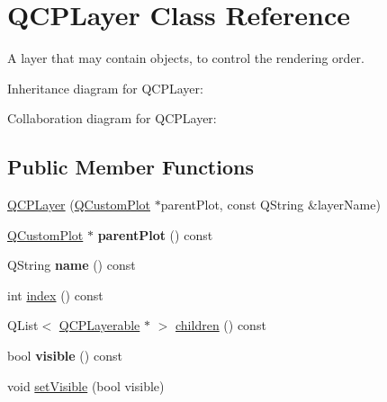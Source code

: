 \hypertarget{class_q_c_p_layer}{}\section{Q\+C\+P\+Layer Class Reference}
\label{class_q_c_p_layer}


A layer that may contain objects, to control the rendering order.  




Inheritance diagram for Q\+C\+P\+Layer\+:


Collaboration diagram for Q\+C\+P\+Layer\+:
\subsection*{Public Member Functions}
\begin{DoxyCompactItemize}
\item 
\hyperlink{class_q_c_p_layer_a5d0657fc86d624e5efbe930ef21af718}{Q\+C\+P\+Layer} (\hyperlink{class_q_custom_plot}{Q\+Custom\+Plot} $\ast$parent\+Plot, const Q\+String \&layer\+Name)
\item 
\hyperlink{class_q_custom_plot}{Q\+Custom\+Plot} $\ast$ {\bfseries parent\+Plot} () const \hypertarget{class_q_c_p_layer_a3958c9a938c2d05a7378c41484acee08}{}\label{class_q_c_p_layer_a3958c9a938c2d05a7378c41484acee08}

\item 
Q\+String {\bfseries name} () const \hypertarget{class_q_c_p_layer_a96ebd1e436f3813938cb9cd4a59a60be}{}\label{class_q_c_p_layer_a96ebd1e436f3813938cb9cd4a59a60be}

\item 
int \hyperlink{class_q_c_p_layer_ad5d7010829a6b99f326b07d7e37c8c99}{index} () const 
\item 
Q\+List$<$ \hyperlink{class_q_c_p_layerable}{Q\+C\+P\+Layerable} $\ast$ $>$ \hyperlink{class_q_c_p_layer_a94c2f0100e48cefad2de8fe0fbb03c27}{children} () const 
\item 
bool {\bfseries visible} () const \hypertarget{class_q_c_p_layer_a9efca636e4dcad721999a6282f296016}{}\label{class_q_c_p_layer_a9efca636e4dcad721999a6282f296016}

\item 
void \hyperlink{class_q_c_p_layer_ac07671f74edf6884b51a82afb2c19516}{set\+Visible} (bool visible)
\end{DoxyCompactItemize}
